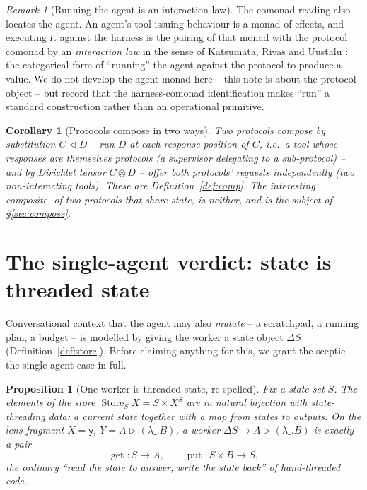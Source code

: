 \documentclass[11pt]{amsart}
\newcommand{\ctr}{\mathbin{\triangleright}}      %
\newcommand{\comp}{\mathbin{\triangleleft}}       %
\newcommand{\y}{\mathsf{y}}
\DeclareMathOperator{\Store}{Store}
\DeclareMathOperator{\getop}{get}
\DeclareMathOperator{\putop}{put}
\theoremstyle{plain}
\newtheorem{proposition}{Proposition}
\newtheorem{corollary}{Corollary}
\theoremstyle{definition}
\theoremstyle{remark}
\newtheorem{remark}{Remark}
\begin{document}
\begin{remark}[Running the agent is an interaction law]\label{rem:interaction}
The comonad reading also locates the agent. An agent's tool-issuing behaviour is a monad of effects,
and executing it against the harness is the pairing of that monad with the protocol comonad by an
\emph{interaction law} in the sense of Katsumata, Rivas and Uustalu \cite{interactionlaws}: the
categorical form of ``running'' the agent against the protocol to produce a value. We do not develop
the agent-monad here -- this note is about the protocol object -- but record that the harness-comonad
identification makes ``run'' a standard construction rather than an operational primitive.
\end{remark}

\begin{corollary}[Protocols compose in two ways]\label{cor:compose}
Two protocols compose by substitution $C\comp D$ -- run $D$ at each response position of $C$, i.e.\ a
tool whose responses are themselves protocols (a supervisor delegating to a sub-protocol) -- and by
Dirichlet tensor $C\otimes D$ -- offer both protocols' requests independently (two non-interacting
tools). These are Definition~\ref{def:comp}. The interesting composite, of two protocols that share
state, is neither, and is the subject of \S\ref{sec:compose}.
\end{corollary}

\section{The single-agent verdict: state is threaded state}\label{sec:single}

Conversational context that the agent may also \emph{mutate} -- a scratchpad, a running plan, a
budget -- is modelled by giving the worker a state object $\Delta S$ (Definition~\ref{def:store}).
Before claiming anything for this, we grant the sceptic the single-agent case in full.

\begin{proposition}[One worker is threaded state, re-spelled]\label{prop:single}
Fix a state set $S$. The elements of the store $\Store_S X=S\times X^S$ are in natural bijection with
state-threading data: a current state together with a map from states to outputs. On the lens
fragment $X=\y$, $Y=A\ctr(\lambda\_.B)$, a worker $\Delta S\to A\ctr(\lambda\_.B)$ is exactly a pair
\[
  \getop:S\to A,\qquad \putop:S\times B\to S,
\]
the ordinary ``read the state to answer; write the state back'' of hand-threaded code.
\end{proposition}
\end{document}
